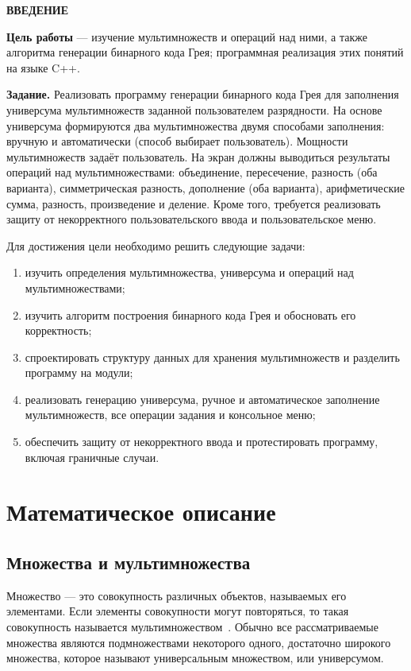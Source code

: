 \documentclass[14pt,a4paper]{extarticle}
\let\oldsection\section
\renewcommand\section{\clearpage\oldsection}
\newcommand{\structhead}[2]{%
  \clearpage\phantomsection
  \begin{center}\normalfont\bfseries\fontsize{14}{16}\selectfont #1\end{center}\vspace{6pt}
  \addcontentsline{toc}{section}{#2}}
\begin{document}
\structhead{ВВЕДЕНИЕ}{Введение}

\textbf{Цель работы} --- изучение мультимножеств и операций над ними, а также алгоритма генерации бинарного кода Грея; программная реализация этих понятий на языке C++.

\textbf{Задание.} Реализовать программу генерации бинарного кода Грея для заполнения универсума мультимножеств заданной пользователем разрядности. На основе универсума формируются два мультимножества двумя способами заполнения: вручную и автоматически (способ выбирает пользователь). Мощности мультимножеств задаёт пользователь. На экран должны выводиться результаты операций над мультимножествами: объединение, пересечение, разность (оба варианта), симметрическая разность, дополнение (оба варианта), арифметические сумма, разность, произведение и деление. Кроме того, требуется реализовать защиту от некорректного пользовательского ввода и пользовательское меню.

Для достижения цели необходимо решить следующие задачи:
\begin{enumerate}
\item изучить определения мультимножества, универсума и операций над мультимножествами;
\item изучить алгоритм построения бинарного кода Грея и обосновать его корректность;
\item спроектировать структуру данных для хранения мультимножеств и разделить программу на модули;
\item реализовать генерацию универсума, ручное и автоматическое заполнение мультимножеств, все операции задания и консольное меню;
\item обеспечить защиту от некорректного ввода и протестировать программу, включая граничные случаи.
\end{enumerate}

\section{Математическое описание}

\subsection{Множества и мультимножества}

Множество --- это совокупность различных объектов, называемых его элементами. Если элементы совокупности могут повторяться, то такая совокупность называется мультимножеством~\cite{novikov}. Обычно все рассматриваемые множества являются подмножествами некоторого одного, достаточно широкого множества, которое называют универсальным множеством, или универсумом.
\end{document}
